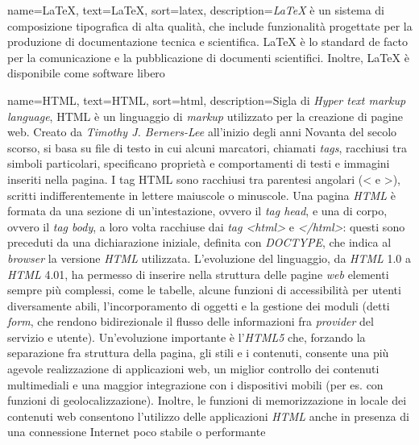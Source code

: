  {
    name=LaTeX,
    text=LaTeX,
    sort=latex,
    description={\emph{LaTeX} è un sistema di composizione tipografica di alta qualità, che include funzionalità progettate per la produzione di documentazione tecnica e scientifica. LaTeX è lo standard de facto per la comunicazione e la pubblicazione di documenti scientifici. Inoltre, LaTeX è disponibile come software libero}
}

 {
    name=HTML,
    text=HTML,
    sort=html,
    description={Sigla di \emph{Hyper text markup language}, HTML è un linguaggio di \emph{markup} utilizzato per la creazione di pagine web.
    Creato da \emph{Timothy J. Berners-Lee} all’inizio degli anni Novanta del secolo scorso, si basa su file di testo in cui alcuni marcatori, chiamati \emph{tags}, racchiusi tra simboli particolari, specificano proprietà e comportamenti di testi e immagini inseriti nella pagina.
    I tag HTML sono racchiusi tra parentesi angolari (< e >), scritti indifferentemente in lettere maiuscole o minuscole. 
    Una pagina \emph{HTML} è formata da una sezione di un’intestazione, ovvero il \emph{tag head}, e una di corpo, ovvero il \emph{tag body}, a loro volta racchiuse dai \emph{tag <html>} e \emph{</html>}: questi sono preceduti da una dichiarazione iniziale, definita con \emph{DOCTYPE}, che indica al \emph{browser} la versione \emph{HTML} utilizzata. L’evoluzione del linguaggio, da \emph{HTML} 1.0 a \emph{HTML} 4.01, ha permesso di inserire nella struttura delle pagine \emph{web} elementi sempre più complessi, come le tabelle, alcune funzioni di accessibilità per utenti diversamente abili, l’incorporamento di oggetti e la gestione dei moduli (detti \emph{form}, che rendono bidirezionale il flusso delle informazioni fra \emph{provider} del servizio e utente). 
    Un’evoluzione importante è l’\emph{HTML5} che, forzando la separazione fra struttura della pagina, gli stili e i contenuti, consente una più agevole realizzazione di applicazioni web, un miglior controllo dei contenuti multimediali e una maggior integrazione con i dispositivi mobili (per es. con funzioni di geolocalizzazione). 
    Inoltre, le funzioni di memorizzazione in locale dei contenuti web consentono l’utilizzo delle applicazioni \emph{HTML} anche in presenza di una connessione Internet poco stabile o performante}
}

